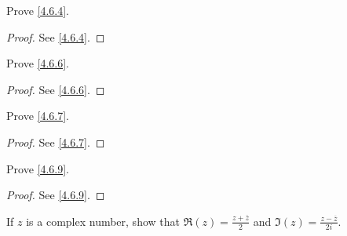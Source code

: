 \exercisesection

\begin{exercise}\label{ex 4.6.1}
  Prove \cref{4.6.4}.
\end{exercise}

\begin{proof}
  See \cref{4.6.4}.
\end{proof}

\begin{exercise}\label{ex 4.6.2}
  Prove \cref{4.6.6}.
\end{exercise}

\begin{proof}
  See \cref{4.6.6}.
\end{proof}

\begin{exercise}\label{ex 4.6.3}
  Prove \cref{4.6.7}.
\end{exercise}

\begin{proof}
  See \cref{4.6.7}.
\end{proof}

\begin{exercise}\label{ex 4.6.4}
  Prove \cref{4.6.9}.
\end{exercise}

\begin{proof}
  See \cref{4.6.9}.
\end{proof}

\begin{exercise}\label{ex 4.6.5}
  If \(z\) is a complex number, show that \(\Re(z) = \frac{z + \overline{z}}{2}\) and \(\Im(z) = \frac{z - \overline{z}}{2i}\).
\end{exercise}

